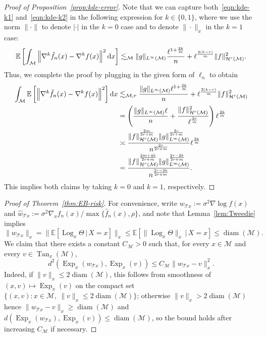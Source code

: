 \documentclass[preprint]{imsart}
\theoremstyle{plain}
\theoremstyle{definition}
\newcommand{\Ebb}{\mathbb{E}}
\newcommand{\Mcal}{\mathcal{M}}
\newcommand{\Hcal}{\mathcal{H}}
\newcommand{\diff}{\textnormal{d}}
\DeclareMathOperator{\Tan}{Tan}
\newcommand{\T}{\mathcal{T}}
\DeclareMathOperator{\Log}{Log}
\DeclareMathOperator{\Exp}{Exp}
\DeclareMathOperator{\diam}{diam}
\begin{document}
\begin{appendix}
\begin{proof}[Proof of Proposition~\ref{prop:kde-error}]
    Note that we can capture both~\eqref{eqn:kde-k1} and~\eqref{eqn:kde-k2} in the following expression for $k\in\{0,1\}$, where we use the norm $\|\cdot\|$ to denote $|\cdot|$ in the $k=0$ case and to denote $\|\cdot\|_x$ in the $k=1$ case:
    \begin{equation*}
        \Ebb\left[\int_{\Mcal}\left\|\nabla^k\hat{f}_n(x)-\nabla^k f(x)\right\|^2\diff x\right] \lesssim_{\Mcal} \|g\|_{L^\infty(\Mcal)}\frac{\ell^{1+\frac{2k}{m}}}{n} + \ell^{\frac{2(k-r)}{m}}\|f\|_{\Hcal^r(\Mcal)}^2. 
    \end{equation*}
    Thus, we complete the proof by plugging in the given form of $\ell_n$ to obtain
    \begin{equation}\label{eqn:density-derivs-est}
        \begin{split}
        \int_{\Mcal}\Ebb\left[\left\|\nabla^k\hat{f}_n(x)-\nabla^k f(x)\right\|^2\right]\diff x &\lesssim_{\Mcal,r} \frac{\|g\|_{L^{\infty}(\Mcal)}\ell^{1+\frac{2k}{m}}}{n} +\ell^{\frac{2(k-r)}{m}}\|f\|_{\Hcal^{r}(\Mcal)}^2 \\
        &=\left(\frac{\|g\|_{L^{\infty}(\Mcal)}\ell}{n} +\frac{\|f\|_{\Hcal^{r}(\Mcal)}^2}{\ell^{\frac{2r}{m}}}\right)\ell^{\frac{2k}{m}} \\
        &\asymp \frac{\|f\|_{\Hcal^{r}(\Mcal)}^{\frac{2m}{2r+m}}\|g\|_{L^{\infty}(\Mcal)}^{\frac{2r}{2r+m}}}{n^{\frac{2r}{2r+m}}} \ell^{\frac{2k}{m}} \\
        &= \frac{\|f\|_{\Hcal^{r}(\Mcal)}^{\frac{2m+4k}{2r+m}}\|g\|_{L^{\infty}(\Mcal)}^{\frac{2r-2k}{2r+m}}}{n^{\frac{2r-2k}{2r+m}}}.
        \end{split}
    \end{equation}
    This implies both claims by taking $k=0$ and $k=1$, respectively.
\end{proof}


\begin{proof}[Proof of Theorem~\ref{thm:EB-risk}]


    For convenience, write $w_{\T x}:=\sigma^2\nabla \log f(x)$ and $\hat{w}_{\T x}:= \sigma^2\nabla_x\hat{f}_n(x)/\max\{\hat{f}_n(x),\rho\}$, and note that Lemma~\ref{lem:Tweedie} implies
    \begin{equation*}
        \|w_{\T x}\|_x = \|\Ebb[\Log_x\Theta\,|\,X=x]\|_x \le \Ebb[\|\Log_x\Theta\|_x\,|\,X=x]  \le \diam(\Mcal).
    \end{equation*}
    We claim that there exists a constant $C_\Mcal>0$ such that, for every
    $x\in\Mcal$ and every $v\in\Tan_x(\Mcal)$,
    \[
        d^2\left(\Exp_x(w_{\T x}),\Exp_x(v)\right)
        \le
        C_\Mcal \|w_{\T x}-v\|_x^2.
    \]
    Indeed, if $\|v\|_x\le 2\diam(\Mcal)$, this follows from smoothness of
    $(x,v)\mapsto \Exp_x(v)$ on the compact set $\{(x,v):x\in\Mcal,\ \|v\|_x\le 2\diam(\Mcal)\}$; otherwise $\|v\|_x>2\diam(\Mcal)$ hence $\|w_{\T x}-v\|_x\ge \diam(\Mcal)$ and $d(\Exp_x(w_{\T x}),\Exp_x(v))\le \diam(\Mcal)$, so the bound holds after increasing $C_\Mcal$ if necessary.


\end{proof}
\end{appendix}
\end{document}
